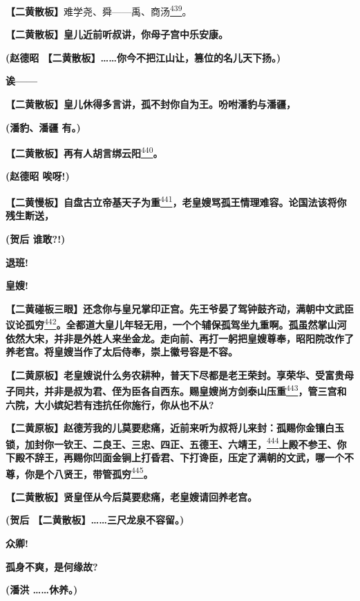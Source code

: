 \textbf{【二黄散板】}难学尧、舜------禹、商汤\protect\hyperlink{fn439}{\textsuperscript{439}}。

\textbf{【二黄散板】皇儿近前听叔讲，你母子宫中乐安康。}

\textbf{(赵德昭
【二黄散板】\ldots{}\ldots{}你今不把江山让，篡位的名儿天下扬。)}

\textbf{诶------}

\textbf{【二黄散板】皇儿休得多言讲，孤不封你自为王。吩咐潘豹与潘疆，}

\textbf{(潘豹、潘疆 有。)}

\textbf{【二黄散板】再有人胡言绑云阳}\protect\hyperlink{fn440}{\textsuperscript{440}}\textbf{。}

\textbf{(赵德昭 唉呀!)}

\textbf{【二黄慢板】自盘古立帝基天子为重}\protect\hyperlink{fn441}{\textsuperscript{441}}\textbf{，老皇嫂骂孤王情理难容。论国法该将你残生断送，}

\textbf{(贺后 谁敢?!)}

\textbf{退班!}

\textbf{皇嫂!}

\textbf{【二黄碰板三眼】还念你与皇兄掌印正宫。先王爷晏了驾钟鼓齐动，满朝中文武臣议论孤穷}\protect\hyperlink{fn442}{\textsuperscript{442}}\textbf{。全都道大皇儿年轻无用，一个个辅保孤驾坐九重啊。孤虽然掌山河依然大宋，并非是外姓人来坐金龙。走向前、再打一躬把皇嫂尊奉，昭阳院改作了养老宫。将皇嫂当作了太后侍奉，崇上徽号容是不容。}

\textbf{【二黄原板】老皇嫂说什么务农耕种，普天下尽都是老王荣封。享荣华、受富贵母子同共，并非是叔为君、侄为臣各自西东。赐皇嫂尚方剑泰山压重}\protect\hyperlink{fn443}{\textsuperscript{443}}\textbf{，管三宫和六院，大小嫔妃若有违抗任你施行，你从也不从?}

\textbf{【二黄原板】赵德芳我的儿莫要悲痛，近前来听为叔将儿来封：孤赐你金镶白玉锁，加封你一钦王、二良王、三忠、四正、五德王、六靖王，}\protect\hyperlink{fn444}{\textsuperscript{444}}\textbf{上殿不参王、你下殿不辞王，再赐你凹面金锏上打昏君、下打谗臣，压定了满朝的文武，哪一个不尊，你是个八贤王，带管孤穷}\protect\hyperlink{fn445}{\textsuperscript{445}}\textbf{。}

\textbf{【二黄散板】贤皇侄从今后莫要悲痛，老皇嫂请回养老宫。}

\textbf{(贺后 【二黄散板】\ldots{}\ldots{}三尺龙泉不容留。)}

\textbf{众卿!}

\textbf{孤身不爽，是何缘故?}

\textbf{(潘洪 \ldots{}\ldots{}休养。)}

